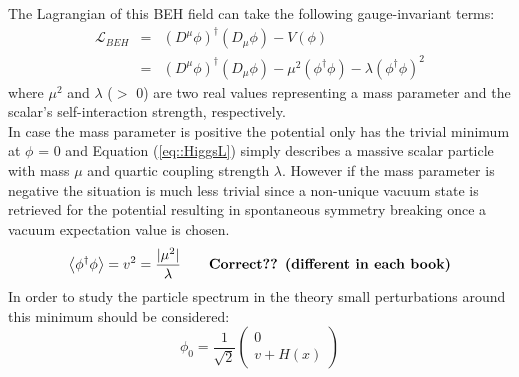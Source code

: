The Lagrangian of this BEH field can take the following gauge-invariant terms:
\begin{eqnarray} \label{eq::HiggsL}
 \mathcal{L}_{BEH} & = & (D^{\mu} \phi)^{\dagger}(D_{\mu} \phi) - V(\phi) \nonumber \\
                   & = & (D^{\mu} \phi)^{\dagger}(D_{\mu} \phi) - \mu^{2} (\phi^{\dagger} \phi) - \lambda (\phi^{\dagger} \phi)^{2}
\end{eqnarray}
where $\mu^{2}$ and $\lambda$ ($>$ 0) are two real values representing a mass parameter and the scalar's self-interaction strength, respectively.
\\
In case the mass parameter is positive the potential only has the trivial minimum at $\phi$ = 0 and Equation (\ref{eq::HiggsL}) simply describes a massive scalar particle with mass $\mu$ and quartic coupling strength $\lambda$. However if the mass parameter is negative the situation is much less trivial since a non-unique vacuum state is retrieved for the potential resulting in spontaneous symmetry breaking once a vacuum expectation value is chosen.
\begin{equation}
 \left< \phi^{\dagger} \phi \right> = v^{2} = \frac{\vert \mu^{2} \vert}{\lambda} \qquad \textrm{\textbf{Correct?? (different in each book)}}
\end{equation}
In order to study the particle spectrum in the theory small perturbations around this minimum should be considered:
\begin{equation}
 \phi_{0} = \frac{1}{\sqrt{2}}\begin{pmatrix}
             0 \\
             v + H(x)
            \end{pmatrix}
\end{equation}
